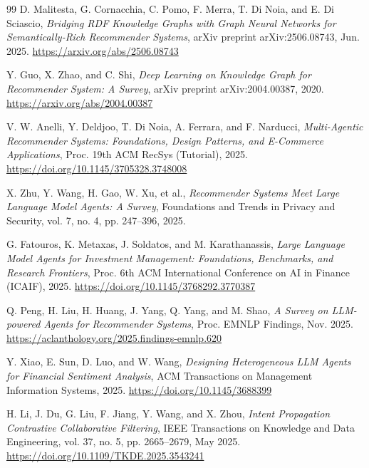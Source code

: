 \documentclass[12pt, a4paper]{article}
\begin{document}
\begin{thebibliography}{99}
D. Malitesta, G. Cornacchia, C. Pomo, F. Merra, T. Di Noia, and E. Di Sciascio,
\textit{Bridging RDF Knowledge Graphs with Graph Neural Networks for
Semantically-Rich Recommender Systems},
arXiv preprint arXiv:2506.08743, Jun. 2025.
\url{https://arxiv.org/abs/2506.08743}

Y. Guo, X. Zhao, and C. Shi,
\textit{Deep Learning on Knowledge Graph for Recommender System: A Survey},
arXiv preprint arXiv:2004.00387, 2020.
\url{https://arxiv.org/abs/2004.00387}

V. W. Anelli, Y. Deldjoo, T. Di Noia, A. Ferrara, and F. Narducci,
\textit{Multi-Agentic Recommender Systems: Foundations, Design Patterns, and
E-Commerce Applications},
Proc. 19th ACM RecSys (Tutorial), 2025.
\url{https://doi.org/10.1145/3705328.3748008}

X. Zhu, Y. Wang, H. Gao, W. Xu, et al.,
\textit{Recommender Systems Meet Large Language Model Agents: A Survey},
Foundations and Trends in Privacy and Security, vol. 7, no. 4, pp. 247--396, 2025.

G. Fatouros, K. Metaxas, J. Soldatos, and M. Karathanassis,
\textit{Large Language Model Agents for Investment Management: Foundations,
Benchmarks, and Research Frontiers},
Proc. 6th ACM International Conference on AI in Finance (ICAIF), 2025.
\url{https://doi.org/10.1145/3768292.3770387}

Q. Peng, H. Liu, H. Huang, J. Yang, Q. Yang, and M. Shao,
\textit{A Survey on LLM-powered Agents for Recommender Systems},
Proc. EMNLP Findings, Nov. 2025.
\url{https://aclanthology.org/2025.findings-emnlp.620}

Y. Xiao, E. Sun, D. Luo, and W. Wang,
\textit{Designing Heterogeneous LLM Agents for Financial Sentiment Analysis},
ACM Transactions on Management Information Systems, 2025.
\url{https://doi.org/10.1145/3688399}

H. Li, J. Du, G. Liu, F. Jiang, Y. Wang, and X. Zhou,
\textit{Intent Propagation Contrastive Collaborative Filtering},
IEEE Transactions on Knowledge and Data Engineering, vol. 37, no. 5,
pp. 2665--2679, May 2025.
\url{https://doi.org/10.1109/TKDE.2025.3543241}

\end{thebibliography}
\end{document}
